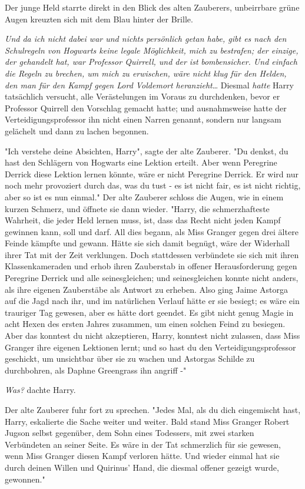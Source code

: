{Der junge Held starrte direkt in den Blick des alten Zauberers, unbeirrbare grüne Augen kreuzten sich mit dem Blau hinter der Brille.

\emph{Und da ich nicht dabei war und nichts persönlich getan habe, gibt es nach den Schulregeln von Hogwarts keine legale Möglichkeit, mich zu bestrafen; der einzige, der gehandelt hat, war Professor Quirrell, und der ist} \emph{bombensicher. Und einfach die Regeln zu brechen, um mich zu erwischen, wäre nicht klug für den Helden, den man für den Kampf gegen Lord Voldemort heranzieht}… Diesmal \emph{hatte} Harry tatsächlich versucht, alle Verästelungen im Voraus zu durchdenken, bevor er Professor Quirrell den Vorschlag gemacht hatte; und ausnahmsweise hatte der Verteidigungsprofessor ihn nicht einen Narren genannt, sondern nur langsam gelächelt und dann zu lachen begonnen.

"Ich verstehe deine Absichten, Harry", sagte der alte Zauberer. "Du denkst, du hast den Schlägern von Hogwarts eine Lektion erteilt. Aber wenn Peregrine Derrick diese Lektion lernen könnte, wäre er nicht Peregrine Derrick. Er wird nur noch mehr provoziert durch das, was du tust - es ist nicht fair, es ist nicht richtig, aber so ist es nun einmal." Der alte Zauberer schloss die Augen, wie in einem kurzen Schmerz, und öffnete sie dann wieder. "Harry, die schmerzhafteste Wahrheit, die jeder Held lernen muss, ist, dass das Recht nicht jeden Kampf gewinnen kann, soll und darf. All dies begann, als Miss Granger gegen drei ältere Feinde kämpfte und gewann. Hätte sie sich damit begnügt, wäre der Widerhall ihrer Tat mit der Zeit verklungen. Doch stattdessen verbündete sie sich mit ihren Klassenkameraden und erhob ihren Zauberstab in offener Herausforderung gegen Peregrine Derrick und alle seinesgleichen; und seinesgleichen konnte nicht anders, als ihre eigenen Zauberstäbe als Antwort zu erheben. Also ging Jaime Astorga auf die Jagd nach ihr, und im natürlichen Verlauf hätte er sie besiegt; es wäre ein trauriger Tag gewesen, aber es hätte dort geendet. Es gibt nicht genug Magie in acht Hexen des ersten Jahres zusammen, um einen solchen Feind zu besiegen. Aber das konntest du nicht akzeptieren, Harry, konntest nicht zulassen, dass Miss Granger ihre eigenen Lektionen lernt; und so hast du den Verteidigungsprofessor geschickt, um unsichtbar über sie zu wachen und Astorgas Schilde zu durchbohren, als Daphne Greengrass ihn angriff -"

\emph{Was?} dachte Harry.

Der alte Zauberer fuhr fort zu sprechen. "Jedes Mal, als du dich eingemischt hast, Harry, eskalierte die Sache weiter und weiter. Bald stand Miss Granger Robert Jugson selbst gegenüber, dem Sohn eines Todessers, mit zwei starken Verbündeten an seiner Seite. Es wäre in der Tat schmerzlich für sie gewesen, wenn Miss Granger diesen Kampf verloren hätte. Und wieder einmal hat sie durch deinen Willen und Quirinus' Hand, die diesmal offener gezeigt wurde, gewonnen."

}
